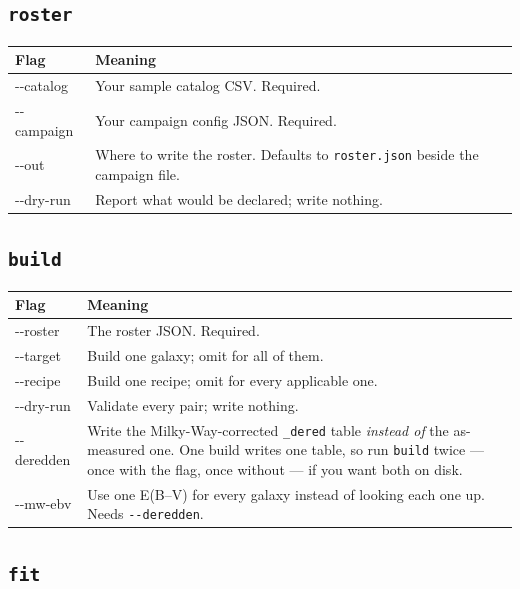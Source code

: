 \documentclass[11pt]{article}
\begin{document}
\subsection{\texttt{roster}}

\begin{longtable}{>{\ttfamily}l p{9.4cm}}
\toprule
\textbf{\normalfont Flag} & \textbf{Meaning} \\
\midrule
\endhead
-{}-catalog & Your sample catalog CSV. Required. \\
-{}-campaign & Your campaign config JSON. Required. \\
-{}-out & Where to write the roster. Defaults to \texttt{roster.json}
  beside the campaign file. \\
-{}-dry-run & Report what would be declared; write nothing. \\
\bottomrule
\end{longtable}

\subsection{\texttt{build}}

\begin{longtable}{>{\ttfamily}l p{9.4cm}}
\toprule
\textbf{\normalfont Flag} & \textbf{Meaning} \\
\midrule
\endhead
-{}-roster & The roster JSON. Required. \\
-{}-target & Build one galaxy; omit for all of them. \\
-{}-recipe & Build one recipe; omit for every applicable one. \\
-{}-dry-run & Validate every pair; write nothing. \\
-{}-deredden & Write the Milky-Way-corrected \texttt{\_dered} table
  \emph{instead of} the as-measured one. One build writes one table, so
  run \texttt{build} twice --- once with the flag, once without --- if
  you want both on disk. \\
-{}-mw-ebv & Use one E(B--V) for every galaxy instead of looking each one
  up. Needs \texttt{-{}-deredden}. \\
\bottomrule
\end{longtable}

\subsection{\texttt{fit}}
\end{document}
